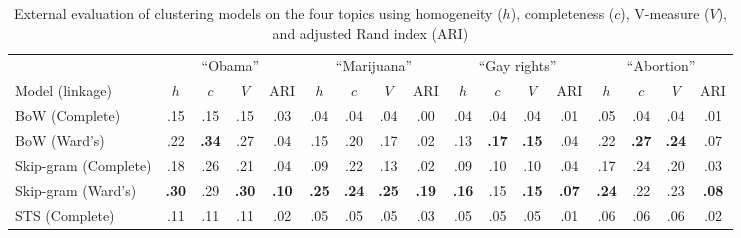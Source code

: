\begin{table}[t]
\begin{center}
{\footnotesize
\setlength{\tabcolsep}{0.5em}
\begin{tabular}{@{}l cccc cccc cccc cccc@{}}
\toprule
& \multicolumn{4}{c}{``Obama''} & \multicolumn{4}{c}{``Marijuana''} &
	\multicolumn{4}{c}{``Gay rights''} & \multicolumn{4}{c}{``Abortion''}
	\\
\cmidrule(lr){2-5}
\cmidrule(lr){6-9}
\cmidrule(lr){10-13}
\cmidrule(lr){14-17}
Model (linkage) &
$h$ & $c$ & $V$ & ARI &
$h$ & $c$ & $V$ & ARI &
$h$ & $c$ & $V$ & ARI &
$h$ & $c$ & $V$ & ARI \\
\midrule
BoW (Complete) &
.15 & .15 & .15 & .03 & 
.04 & .04 & .04 & .00 & 
.04 & .04 & .04 & .01 & 
.05 & .04 & .04 & .01\\
BoW (Ward's) & 
.22 & \textbf{.34} & .27 & .04 & 
.15 & .20 & .17 & .02 & 
.13 & \textbf{.17} & \textbf{.15} & .04 & 
.22 & \textbf{.27} & \textbf{.24} & .07 \\
Skip-gram (Complete) & 
.18 & .26 & .21 & .04 & 
.09 & .22 & .13 & .02 & 
.09 & .10 & .10 & .04 & 
.17 & .24 & .20 & .03  \\
Skip-gram (Ward's) & 
\textbf{.30} & .29 & \textbf{.30} & \textbf{.10} & 
\textbf{.25} & \textbf{.24} & \textbf{.25} & \textbf{.19} & 
\textbf{.16} & .15 & \textbf{.15} & \textbf{.07} & 
\textbf{.24} & .22 & .23 & \textbf{.08} \\
STS (Complete) & .11 & .11 & .11 & .02 & .05 & .05 & .05 & .03	& .05 & .05 & .05 & .01 & .06 & .06 & .06 & .02

 \\
\bottomrule
\end{tabular}}
\caption{External evaluation of clustering models on the four topics using 
	homogeneity ($h$), completeness ($c$), V-measure ($V$), and adjusted
	Rand index (ARI) }
\label{tab:external-eval}
\end{center}
\end{table}

